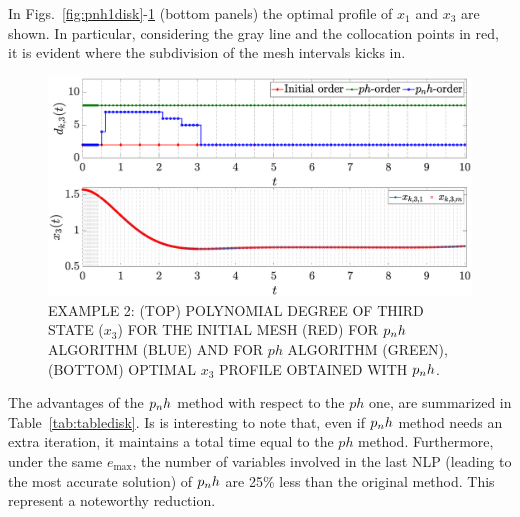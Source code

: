 In Figs.~\ref{fig:pnh1disk}-\ref{fig:pnh2disk} (bottom panels) the optimal profile of $x_1$ and $x_3$ are shown. In particular, considering the gray line and the collocation points in red, it is evident where the subdivision of the mesh intervals kicks in.
\begin{figure}[t]
	\centering
	\includegraphics[trim={1cm 0.1cm 2cm 1.05cm},clip,width=1.\columnwidth]{Img/pnh2_disk2}
	\caption{EXAMPLE 2: (TOP) POLYNOMIAL DEGREE OF THIRD STATE ($x_{3}$) FOR THE INITIAL MESH (RED) FOR $p_{n}h$ ALGORITHM (BLUE) AND FOR $ph$ ALGORITHM (GREEN), (BOTTOM)
	OPTIMAL $x_3$ PROFILE OBTAINED WITH $p_{n}h$.}
	\label{fig:pnh2disk}
\end{figure}

The advantages of the $p_{n}h$ method with respect to the $ph$ one, are summarized in Table~\ref{tab:tabledisk}. Is is interesting to note that, even if $p_{n}h$ method needs an extra iteration, it maintains a total time equal to the $ph$ method. Furthermore, under the same $e_{\max}$, the number of variables involved in the last NLP (leading to the most accurate solution) of $p_{n}h$ are 25\% less than the original method. This represent a noteworthy reduction.


